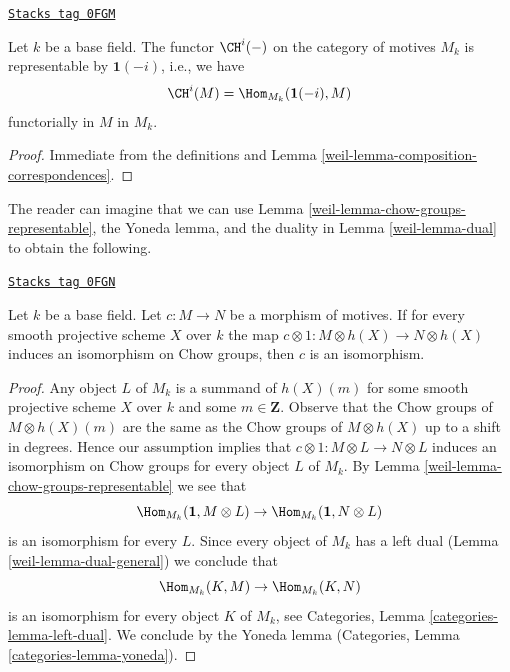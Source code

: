 \begin{lemma}
\label{weil-lemma-chow-groups-representable}
\href{https://stacks.math.columbia.edu/tag/0FGM}{\texttt{Stacks tag 0FGM}}

Let $k$ be a base field. The functor $\CH^i(-)$ on the category
of motives $M_k$ is representable by $\mathbf{1}(-i)$, i.e., we
have
$$
\CH^i(M) = \Hom_{M_k}(\mathbf{1}(-i), M)
$$
functorially in $M$ in $M_k$.
\end{lemma}

\begin{proof}

Immediate from the definitions and
Lemma \ref{weil-lemma-composition-correspondences}.
\end{proof}

The reader can imagine that we can use
Lemma \ref{weil-lemma-chow-groups-representable}, the Yoneda lemma, and
the duality in Lemma \ref{weil-lemma-dual} to obtain the following.

\begin{lemma}[Manin]

\label{weil-lemma-manin}
\href{https://stacks.math.columbia.edu/tag/0FGN}{\texttt{Stacks tag 0FGN}}

Let $k$ be a base field. Let $c : M \to N$ be a morphism of motives.
If for every smooth projective scheme $X$ over $k$ the map
$c \otimes 1 : M \otimes h(X) \to N \otimes h(X)$ induces an isomorphism on
Chow groups, then $c$ is an isomorphism.
\end{lemma}

\begin{proof}

Any object $L$ of $M_k$ is a summand of $h(X)(m)$ for some smooth projective
scheme $X$ over $k$ and some $m \in \mathbf{Z}$. Observe that the Chow groups
of $M \otimes h(X)(m)$ are the same as the Chow groups of $M \otimes h(X)$
up to a shift in degrees. Hence our assumption implies
that $c \otimes 1 : M \otimes L \to N \otimes L$ induces an isomorphism on
Chow groups for every object $L$ of $M_k$. By
Lemma \ref{weil-lemma-chow-groups-representable}
we see that
$$
\Hom_{M_k}(\mathbf{1}, M \otimes L) \to
\Hom_{M_k}(\mathbf{1}, N \otimes L)
$$
is an isomorphism for every $L$. Since every object of $M_k$ has a left dual
(Lemma \ref{weil-lemma-dual-general}) we conclude that
$$
\Hom_{M_k}(K, M) \to \Hom_{M_k}(K, N)
$$
is an isomorphism for every object $K$ of $M_k$, see
Categories, Lemma \ref{categories-lemma-left-dual}.
We conclude by the Yoneda lemma
(Categories, Lemma \ref{categories-lemma-yoneda}).
\end{proof}

